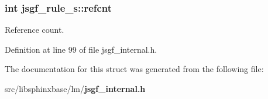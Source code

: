 \subsubsection[{refcnt}]{\setlength{\rightskip}{0pt plus 5cm}int jsgf\+\_\+rule\+\_\+s\+::refcnt}\label{structjsgf__rule__s_aeb4c05f6daa425a37d362e2c6de1228e}


Reference count. 



Definition at line 99 of file jsgf\+\_\+internal.\+h.



The documentation for this struct was generated from the following file\+:\begin{DoxyCompactItemize}
\item 
src/libsphinxbase/lm/{\bf jsgf\+\_\+internal.\+h}\end{DoxyCompactItemize}
